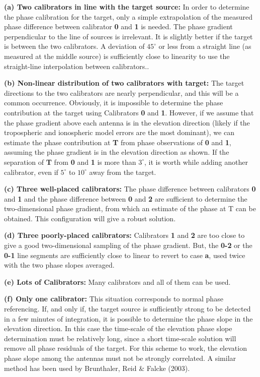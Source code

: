 \begin {description}
\item {\bf (a) Two calibrators in line with the target source:} In
order to determine the phase calibration for the target, only a simple
extrapolation of the measured phase difference between calibrator {\bf
0} and {\bf 1} is needed.  The phase gradient perpendicular to the
line of sources is irrelevant.  It is slightly better if the target is
between the two calibrators.  A deviation of $45^\circ$ or less from a
straight line (as measured at the middle source) is sufficiently close
to linearity to use the straight-line interpolation between
calibrators..

\item {\bf (b) Non-linear distribution of two calibrators with
target:} The target directions to the two calibrators are nearly
perpendicular, and this will be a common occurrence.  Obviously, it is
impossible to determine the phase contribution at the target using
Calibrators {\bf 0} and {\bf 1}.  However, if we assume that the phase
gradient above each antenna is in the elevation direction (likely if
the tropospheric and ionospheric model errors are the most dominant),
we can estimate the phase contribution at {\bf T} from phase
observations of {\bf 0} and {\bf 1}, assuming the phase gradient is in
the elevation direction as shown.  If the separation of {\bf T} from
{\bf 0} and {\bf 1} is more than $3^\circ$, it is worth while adding
another calibrator, even if $5^\circ$ to $10^\circ$ away from the
target.

\item {\bf (c) Three well-placed calibrators:} The phase difference
between calibrators {\bf 0} and {\bf 1} and the phase difference
between {\bf 0} and {\bf 2} are sufficient to determine the
two-dimensional phase gradient, from which an estimate of the phase at
T can be obtained.  This configuration will give a robust solution.

\item {\bf (d) Three poorly-placed calibrators:} Calibrators {\bf 1}
and {\bf 2} are too close to give a good two-dimensional sampling of
the phase gradient.  But, the {\bf 0-2} or the {\bf 0-1} line segments
are sufficiently close to linear to revert to case {\bf a}, used twice
with the two phase slopes averaged.

\item {\bf (e) Lots of Calibrators:} Many calibrators and all of them
can be used.

\item {\bf (f) Only one calibrator:} This situation corresponds to
normal phase referencing.  If, and only if, the target source is
sufficiently strong to be detected in a few minutes of integration, it
is possible to determine the phase slope in the elevation direction.
In this case the time-scale of the elevation phase slope determination
must be relatively long, since a short time-scale solution will remove
all phase residuals of the target.  For this scheme to work, the
elevation phase slope among the antennas must not be strongly
correlated.  A similar method has been used by Brunthaler, Reid \& Falcke
(2003).

\end{description}


